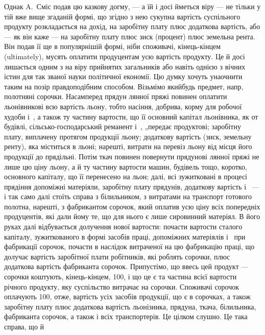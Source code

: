 Однак A.~Сміс подав цю казкову догму, — а їй і досі йметься
віру — не тільки у тій вже вище згаданій формі, що згідно з нею сукупна
вартість суспільного продукту розкладається на дохід, на заробітну
плату плюс додаткова вартість, або — як він каже — на заробітну плату
плюс зиск (процент) плюс земельна рента. Він подав її ще в популярнішій
формі, ніби споживачі, кінець-кінцем (ultimately), мусять оплатити
продуцентам усю вартість продукту. Це й досі лишається
одним з на віру прийнятих загальників або навіть однією з вічних істин
для так званої науки політичної економії. Цю думку хочуть унаочнити таким
на позір правдоподібним способом. Візьмімо якийбудь предмет, напр,
полотняні сорочки. Насамперед прядун лянної пряжі повинен оплатити
льонівникові всю вартість льону, тобто насіння, добрива, корму для робочої
худоби і~, а також ту частину вартости, що її основний
капітал льонівника, як от будівлі, сільсько-господарський реманент і~,
„передає продуктові; заробітну плату, виплачену протягом продукції
льону; додаткову вартість (зиск, земельну ренту), яка міститься в льоні;
нарешті, витрати на перевіз льону від місця його продукції до прядільні.
Потім ткач повинен повернути прядунові лянної пряжі не лише цю
ціну льону, а й ту частину вартости машин, будівель тощо, коротко,
основного капіталу, що її перенесено на льон; далі, всі зужитковані
в процесі прядіння допоміжні матеріяли, заробітну плату прядунів, додаткову
вартість і~ — і так само далі стоїть справа з білильником, з витратами
на транспорт готового полотна, нарешті, з фабрикантом сорочок,
який оплатив усю ціну всіх попередніх продуцентів, які дали йому те,
що для нього є лише сировинний матеріял. В його руках далі відбувається
долучення нової вартости: почасти вартости сталого капіталу, зужиткованого
в формі засобів праці, допоміжних матеріялів і~ при фабрикації
сорочок, почасти в наслідок витраченої на цю фабрикацію праці,
що долучає вартість заробітної плати робітників, які роблять сорочки,
плюс додаткова вартість фабриканта сорочок. Припустімо, що ввесь цей
продукт — сорочки коштують, кінець-кінцем, 100, і що це є
та частина всієї вартости річного продукту, яку суспільство витрачає на
сорочки. Споживачі сорочок оплачують 100, отже, вартість усіх
засобів продукції, що є в сорочках, а також заробітну плату плюс додаткова
вартість льонізника, прядуна, ткача, білильника, фабриканта сорочок,
а також і всіх транспортерів. Це цілком слушно. Це така справа, що й
